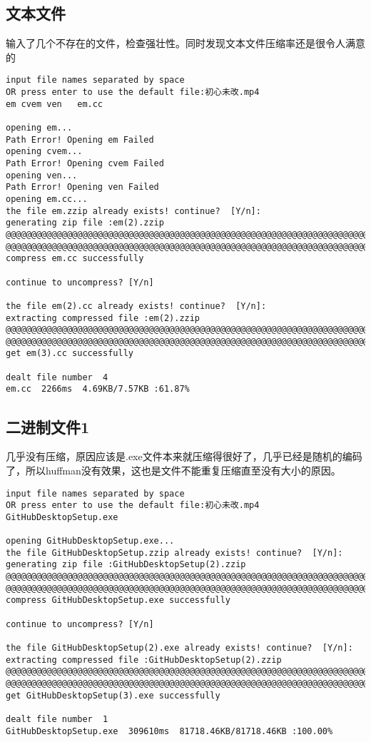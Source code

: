 \documentclass[UTF8]{ctexart}
\begin{document}
\subsection{文本文件}
输入了几个不存在的文件，检查强壮性。同时发现文本文件压缩率还是很令人满意的	
\begin{verbatim}
input file names separated by space
OR press enter to use the default file:初心未改.mp4
em cvem ven   em.cc

opening em...
Path Error! Opening em Failed
opening cvem...
Path Error! Opening cvem Failed
opening ven...
Path Error! Opening ven Failed
opening em.cc...
the file em.zzip already exists! continue?  [Y/n]:
generating zip file :em(2).zzip
@@@@@@@@@@@@@@@@@@@@@@@@@@@@@@@@@@@@@@@@@@@@@@@@@@@@@@@@@@@@@@@@@@@@@@@@@@@@@@@@
@@@@@@@@@@@@@@@@@@@@@@@@@@@@@@@@@@@@@@@@@@@@@@@@@@@@@@@@@@@@@@@@@@@@@@@@@@@@@@@@
compress em.cc successfully

continue to uncompress? [Y/n]

the file em(2).cc already exists! continue?  [Y/n]:
extracting compressed file :em(2).zzip
@@@@@@@@@@@@@@@@@@@@@@@@@@@@@@@@@@@@@@@@@@@@@@@@@@@@@@@@@@@@@@@@@@@@@@@@@@@@@@@@
@@@@@@@@@@@@@@@@@@@@@@@@@@@@@@@@@@@@@@@@@@@@@@@@@@@@@@@@@@@@@@@@@@@@@@@@@@@@@@@@
get em(3).cc successfully

dealt file number  4
em.cc  2266ms  4.69KB/7.57KB :61.87%
\end{verbatim}
\subsection{二进制文件1}
几乎没有压缩，原因应该是.exe文件本来就压缩得很好了，几乎已经是随机的编码了，所以huffman没有效果，这也是文件不能重复压缩直至没有大小的原因。
\begin{verbatim}
input file names separated by space
OR press enter to use the default file:初心未改.mp4
GitHubDesktopSetup.exe

opening GitHubDesktopSetup.exe...
the file GitHubDesktopSetup.zzip already exists! continue?  [Y/n]:
generating zip file :GitHubDesktopSetup(2).zzip
@@@@@@@@@@@@@@@@@@@@@@@@@@@@@@@@@@@@@@@@@@@@@@@@@@@@@@@@@@@@@@@@@@@@@@@@@@@@@@@@
@@@@@@@@@@@@@@@@@@@@@@@@@@@@@@@@@@@@@@@@@@@@@@@@@@@@@@@@@@@@@@@@@@@@@@@@@@@@@@@@
compress GitHubDesktopSetup.exe successfully

continue to uncompress? [Y/n]

the file GitHubDesktopSetup(2).exe already exists! continue?  [Y/n]:
extracting compressed file :GitHubDesktopSetup(2).zzip
@@@@@@@@@@@@@@@@@@@@@@@@@@@@@@@@@@@@@@@@@@@@@@@@@@@@@@@@@@@@@@@@@@@@@@@@@@@@@@@@
@@@@@@@@@@@@@@@@@@@@@@@@@@@@@@@@@@@@@@@@@@@@@@@@@@@@@@@@@@@@@@@@@@@@@@@@@@@@@@@@
get GitHubDesktopSetup(3).exe successfully

dealt file number  1
GitHubDesktopSetup.exe  309610ms  81718.46KB/81718.46KB :100.00%
\end{verbatim}
\end{document}
